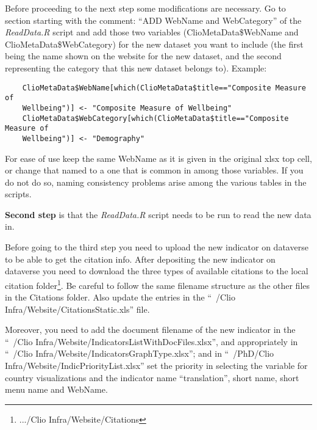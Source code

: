 \documentclass[a4paper]{article}
\begin{document}
 Before proceeding to the next step some modifications are necessary. Go to section starting with the 
comment: ``ADD WebName and WebCategory'' of the \textit{ReadData.R} script and add those two variables 
(ClioMetaData\$WebName and ClioMetaData\$WebCategory) for the new dataset you 
want to include (the first being the name shown on the website for the new 
dataset, and the second representing the category that this new dataset belongs 
to). Example:

\begin{verbatim}
	ClioMetaData$WebName[which(ClioMetaData$title=="Composite Measure of 
	Wellbeing")] <- "Composite Measure of Wellbeing"
	ClioMetaData$WebCategory[which(ClioMetaData$title=="Composite Measure of 
	Wellbeing")] <- "Demography"
\end{verbatim}

For ease of use keep the same WebName as it is given in the original xlsx top cell, or change that named to a one that is common in among those variables. If you do not do so, naming consistency problems arise among the various tables in the scripts.

\textbf{Second step} is that the \textit{ReadData.R} script needs to be run to read the new data in.

Before going to the third step you need to upload the new indicator on dataverse to be able to get the citation info. After depositing the new indicator on dataverse you need to download the three types of available citations to the local citation folder\footnote{.../Clio Infra/Website/Citations}. Be careful to follow the same filename structure as the other files in the Citations folder. Also update the entries in the ``~/Clio Infra/Website/CitationsStatic.xls'' file. %

Moreover, you need to add the document filename of the new indicator in the ``~/Clio Infra/Website/IndicatorsListWithDocFiles.xlsx'', and appropriately in ``~/Clio Infra/Website/IndicatorsGraphType.xlsx''; and in ``~/PhD/Clio Infra/Website/IndicPriorityList.xlsx'' set the priority in selecting the variable for country visualizations and the indicator name ``translation'', short name, short menu name and WebName.
\end{document}
